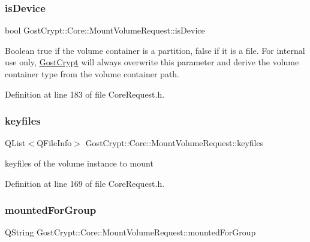 \subsubsection{\texorpdfstring{is\+Device}{isDevice}}
{\footnotesize\ttfamily bool Gost\+Crypt\+::\+Core\+::\+Mount\+Volume\+Request\+::is\+Device}

Boolean true if the volume container is a partition, false if it is a file. For internal use only, \hyperlink{namespace_gost_crypt}{Gost\+Crypt} will always overwrite this parameter and derive the volume container type from the volume container path. 

Definition at line 183 of file Core\+Request.\+h.

\mbox{\label{struct_gost_crypt_1_1_core_1_1_mount_volume_request_ab18918435d55773483cb8ec0be1d7f09}} 
\subsubsection{\texorpdfstring{keyfiles}{keyfiles}}
{\footnotesize\ttfamily Q\+List$<$Q\+File\+Info$>$ Gost\+Crypt\+::\+Core\+::\+Mount\+Volume\+Request\+::keyfiles}

keyfiles of the volume instance to mount 

Definition at line 169 of file Core\+Request.\+h.

\mbox{\label{struct_gost_crypt_1_1_core_1_1_mount_volume_request_a5180a30572a910adb0750ce7a3ecc016}} 
\subsubsection{\texorpdfstring{mounted\+For\+Group}{mountedForGroup}}
{\footnotesize\ttfamily Q\+String Gost\+Crypt\+::\+Core\+::\+Mount\+Volume\+Request\+::mounted\+For\+Group}

